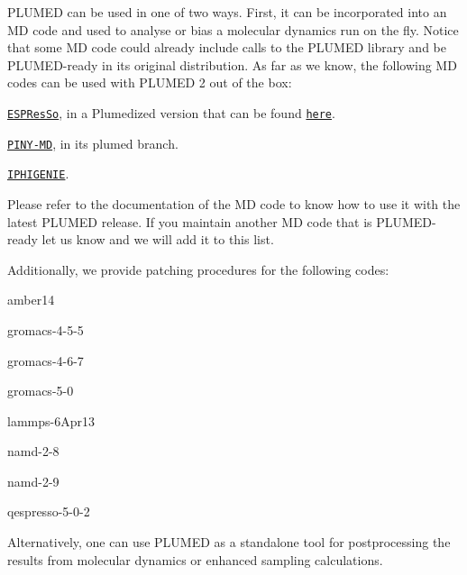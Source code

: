 P\+L\+U\+M\+E\+D can be used in one of two ways. First, it can be incorporated into an M\+D code and used to analyse or bias a molecular dynamics run on the fly. Notice that some M\+D code could already include calls to the P\+L\+U\+M\+E\+D library and be P\+L\+U\+M\+E\+D-\/ready in its original distribution. As far as we know, the following M\+D codes can be used with P\+L\+U\+M\+E\+D 2 out of the box\+:
\begin{DoxyItemize}
\item \href{http://espressomd.org}{\tt E\+S\+P\+Res\+So}, in a Plumedized version that can be found \href{http://davidebr.github.io/espresso/}{\tt here}.
\item \href{http://github.com/TuckermanGroup/PINY}{\tt P\+I\+N\+Y-\/\+M\+D}, in its plumed branch.
\item \href{http://sourceforge.net/projects/iphigenie/}{\tt I\+P\+H\+I\+G\+E\+N\+I\+E}.
\end{DoxyItemize}

Please refer to the documentation of the M\+D code to know how to use it with the latest P\+L\+U\+M\+E\+D release. If you maintain another M\+D code that is P\+L\+U\+M\+E\+D-\/ready let us know and we will add it to this list.

Additionally, we provide patching procedures for the following codes\+:


\begin{DoxyItemize}
\item amber14
\item gromacs-\/4-\/5-\/5
\item gromacs-\/4-\/6-\/7
\item gromacs-\/5-\/0
\item lammps-\/6\+Apr13
\item namd-\/2-\/8
\item namd-\/2-\/9
\item qespresso-\/5-\/0-\/2
\end{DoxyItemize}

Alternatively, one can use P\+L\+U\+M\+E\+D as a standalone tool for postprocessing the results from molecular dynamics or enhanced sampling calculations. 